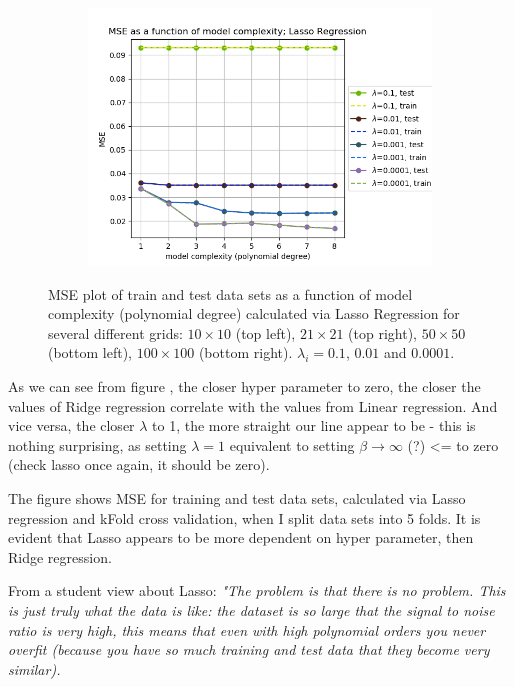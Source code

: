 \begin{figure}[!ht]
\begin{subfigure}{\textwidth}
\end{subfigure}
\begin{subfigure}{\textwidth}
  \centering
  \includegraphics[width=0.55\linewidth]{images/mse/fake_lasso_mse_p08_n100.png}
\end{subfigure}
\caption{MSE plot of train and test data sets as a function of model complexity (polynomial degree) calculated via Lasso Regression for several different grids: $10\times10$ (top left), $21\times21$ (top right), $50\times50$ (bottom left), $100\times100$ (bottom right). $\lambda_i = 0.1$, $0.01$ and $0.0001$.}
\label{fig:lasso-mse}
\end{figure}

As we can see from figure \rf{}, the closer hyper parameter to zero, the closer the values of Ridge regression correlate with the values from Linear regression. And vice versa, the closer $\lambda$ to 1, the more straight our line appear to be - this is nothing surprising, as setting $\lambda=1$ equivalent to setting $\beta\rightarrow\infty$ (?) <= to zero (check lasso once again, it should be zero).

The figure \rf{} shows MSE for training and test data sets, calculated via Lasso regression and kFold cross validation, when I split data sets into 5 folds. It is evident that Lasso appears to be more dependent on hyper parameter, then Ridge regression.

From a student view about Lasso:
\textit{"The problem is that there is no problem. This is just truly what the data is like: the dataset is so large that the signal to noise ratio is very high, this means that even with high polynomial orders you never overfit (because you have so much training and test data that they become very similar).}



